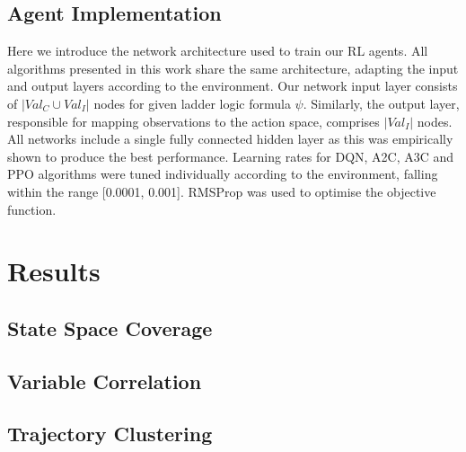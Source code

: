 \documentclass[runningheads]{llncs}
\begin{document}
\subsection{Agent Implementation}
Here we introduce the network architecture used to train our RL agents. All algorithms presented in this work share the same architecture, adapting the input and output layers according to the environment. Our network input layer consists of $|Val_C \cup Val_I|$ nodes for given ladder logic formula $\psi$. Similarly, the output layer, responsible for mapping observations to the action space, comprises $|Val_I|$ nodes. All networks include a single fully connected hidden layer as this was empirically shown to produce the best performance. Learning rates for DQN, A2C, A3C and PPO algorithms were tuned individually according to the environment, falling within the range [0.0001, 0.001]. RMSProp was used to optimise the objective function. 

\section{Results}\label{sec:results}
\subsection{State Space Coverage}

\subsection{Variable Correlation}

\subsection{Trajectory Clustering}
\end{document}
